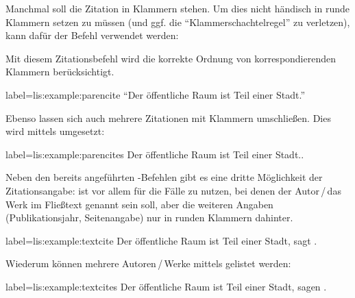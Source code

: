  
Manchmal soll die Zitation in Klammern stehen.
Um dies nicht händisch in runde Klammern setzen zu müssen (und ggf. die \enquote{Klammerschachtelregel} zu verletzen),
kann dafür der Befehl   verwendet werden:
Mit diesem Zitationsbefehl wird die korrekte Ordnung von korrespondierenden Klammern berücksichtigt.
\begin{lfgwexample}{label={lis:example:parencite}}
\enquote{Der öffentliche Raum ist Teil einer Stadt.} \parencite{Osland2016}
\end{lfgwexample}

Ebenso lassen sich auch mehrere Zitationen mit Klammern umschließen.
Dies wird mittels  umgesetzt:
\begin{lfgwexample}{label={lis:example:parencites}}
Der öffentliche Raum ist Teil einer Stadt.\parencites(s.)(){Osland2016}
[vgl.][]{Evangelidis2014}.
\end{lfgwexample}

Neben den bereits angeführten -Befehlen gibt es eine dritte Möglichkeit der Zitationsangabe:
 ist vor allem für die Fälle zu nutzen, 
bei denen der Autor\,/\,das Werk im Fließtext genannt sein soll, 
aber die weiteren Angaben (Publikationsjahr, Seitenangabe) nur in runden Klammern dahinter.

\begin{lfgwexample}{label={lis:example:textcite}}
Der öffentliche Raum ist Teil einer Stadt, sagt \textcite{Osland2016}.
\end{lfgwexample}

Wiederum können mehrere Autoren\,/\,Werke mittels  gelistet werden:
\begin{lfgwexample}{label={lis:example:textcites}}
Der öffentliche Raum ist Teil einer Stadt, sagen \textcites{Osland2016}
[vgl.][]{Evangelidis2014}.
\end{lfgwexample}

